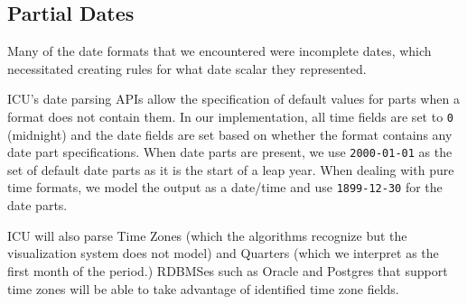 \subsection{Partial Dates}
Many of the date formats that we encountered were incomplete dates, which necessitated creating rules for what date scalar they represented.

ICU's date parsing APIs allow the specification of default values for parts when a format does not contain them. In our implementation, all time fields are set to \texttt{0} (midnight) and the date fields are set based on whether the format contains any date part specifications. When date parts are present, we use \texttt{2000-01-01} as the set of default date parts as it is the start of a leap year. When dealing with pure time formats, we model the output as a date/time and use \texttt{1899-12-30} for the date parts.

ICU will also parse Time Zones (which the algorithms recognize but the visualization system does not model) and Quarters (which we interpret as the first month of the period.) RDBMSes such as Oracle and Postgres that support time zones will be able to take advantage of  identified time zone fields.
